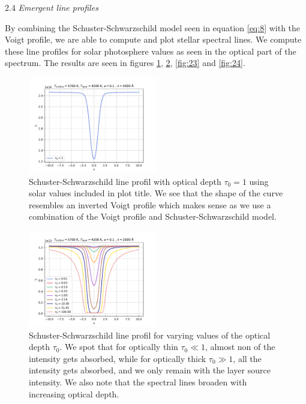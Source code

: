 \documentclass[a4paper,11.5pt,]{article}
\begin{document}
\begin{multicols}{2}
\begin{center}
2.4\textit{ Emergent line profiles}
\end{center}

By combining the Schuster-Schwarzschild model seen in equation \eqref{eq:8} with the Voigt profile, we are able to compute and plot stellar spectral lines. We compute these line profiles for solar photosphere values as seen in the optical part of the spectrum. The results are seen in figures \ref{fig:21}, \ref{fig:22}, \ref{fig:23} and \ref{fig:24}.
\begin{figure}[H]
	\centering
	\includegraphics[width=0.5\textwidth]{SSA/figures/ssline.pdf}
	\caption{Schuster-Schwarzschild line profil with optical depth $\tau_0 = 1$ using solar values included in plot title. We see that the shape of the curve resembles an inverted Voigt profile which makes sense as we use a combination of the Voigt profile and Schuster-Schwarzschild model.}
	\label{fig:21}
\end{figure}


\begin{figure}[H]
	\centering
	\includegraphics[width=0.5\textwidth]{SSA/figures/ss0.pdf}
	\caption{Schuster-Schwarzschild line profil for varying values of the optical depth $\tau_0$. We spot that for optically thin $\tau_0 \ll 1$, almost non of the intensity gets absorbed, while for optically thick $\tau_0 \gg 1$, all the intensity gets absorbed, and we only remain with the layer source intensity. We also note that the spectral lines broaden with increasing optical depth. }
	\label{fig:22}
\end{figure}



\end{multicols}
\end{document}
